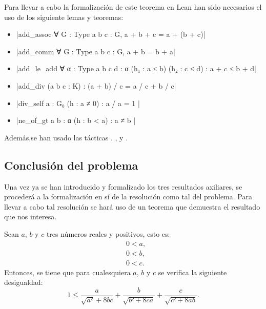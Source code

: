 Para llevar a cabo la formalización de este teorema en Lean han sido
necesarios el uso de los siguiente lemas y teoremas:
\begin{itemize}
\item {}|add_assoc ∀ {G : Type} {a b c : G}, a + b + c = a + (b + c)|
\item {}|add_comm ∀ {G : Type} {a b c : G}, a + b  = b + a|
\item {}|add_le_add ∀ {α : Type} {a b c d : α} (h₁ : a ≤ b) (h₂ : c ≤ d) : a + c ≤ b + d|
\item {}|add_div (a b c : K) : (a + b) / c = a / c + b / c|
\item {}|div_self {a : G₀} (h : a ≠ 0) : a / a = 1 |
\item {}|ne_of_gt {a b : α} (h : b < a) : a ≠ b |
\end{itemize}

Además,se han usado las tácticas
.
,
 y
.


\subsection{Conclusión del problema}
Una vez ya se han introducido y formalizado los tres resultados
axiliares, se procederá a la formalización en sí de la resolución
como tal del problema. Para llevar a cabo tal resolución se hará uso
de un teorema que demuestra el resultado que nos interesa.

\begin{teorema}
  Sean \(a\), \(b\) y \(c\) tres números reales y positivos, esto es:
  \begin{align}
    &0<a, \label{haq2te}\tag{ha}\\
    &0<b, \label{hbq2te}\tag{hb}\\
    &0<c. \label{hcq2te}\tag{hc}
  \end{align}
  Entonces, se tiene que para cualesquiera \(a\), \(b\) y \(c\) se
  verifica la siguiente desigualdad:
  \begin{equation}\label{eqfinal}
    1≤\frac{a}{\sqrt{a²}+8bc}+\frac{b}{\sqrt{b²+8ca}}+
    \frac{c}{\sqrt{c²+8ab}}.
  \end{equation}
\end{teorema}

